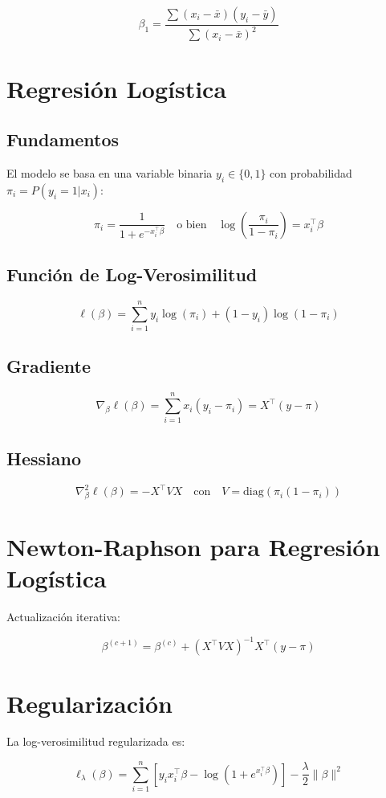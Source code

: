 \documentclass[12pt]{article}
\begin{document}
\[
\beta_1 = \frac{\sum (x_i - \bar{x})(y_i - \bar{y})}{\sum (x_i - \bar{x})^2}
\]

\section{Regresión Logística}
\subsection{Fundamentos}
El modelo se basa en una variable binaria $y_i \in \{0,1\}$ con probabilidad $\pi_i = P(y_i = 1|x_i)$:

\[
\pi_i = \frac{1}{1 + e^{-x_i^\top \beta}} \quad \text{o bien} \quad \log\left(\frac{\pi_i}{1 - \pi_i}\right) = x_i^\top \beta
\]

\subsection{Función de Log-Verosimilitud}
\[
\ell(\beta) = \sum_{i=1}^{n} y_i \log(\pi_i) + (1 - y_i) \log(1 - \pi_i)
\]

\subsection{Gradiente}
\[
\nabla_\beta \ell(\beta) = \sum_{i=1}^n x_i (y_i - \pi_i) = X^\top (y - \pi)
\]

\subsection{Hessiano}
\[
\nabla^2_\beta \ell(\beta) = -X^\top V X \quad \text{con} \quad V = \text{diag}(\pi_i (1 - \pi_i))
\]

\section{Newton-Raphson para Regresión Logística}
Actualización iterativa:

\[
\beta^{(c+1)} = \beta^{(c)} + (X^\top V X)^{-1} X^\top (y - \pi)
\]

\section{Regularización}
La log-verosimilitud regularizada es:

\[
\ell_\lambda(\beta) = \sum_{i=1}^n \left[y_i x_i^\top \beta - \log(1 + e^{x_i^\top \beta})\right] - \frac{\lambda}{2} \|\beta\|^2
\]
\end{document}
